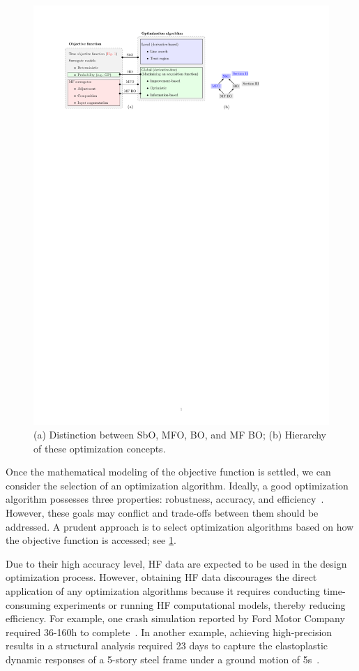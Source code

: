 \documentclass[iicol,sn-basic]{sn-jnl}%
\begin{document}
\begin{figure}
	\centering
	\includegraphics[scale=0.82]{Fig2.pdf}
	\caption{(a) Distinction between SbO, MFO, BO, and MF BO; (b) Hierarchy of these optimization concepts.}
	\label{Fig1}
\end{figure}

Once the mathematical modeling of the objective function is settled, we can consider the selection of an optimization algorithm.
Ideally, a good optimization algorithm possesses three properties: robustness, accuracy, and efficiency~\citep{Nocedal2006}.
However, these goals may conflict and trade-offs between them should be addressed.
A prudent approach is to select optimization algorithms based on how the objective function is accessed; see \cref{Fig1}.

Due to their high accuracy level, HF data are expected to be used in the design optimization process.
However, obtaining HF data discourages the direct application of any optimization algorithms because it requires conducting time-consuming experiments or running HF computational models, thereby reducing efficiency.
For example, one crash simulation reported by Ford Motor Company required 36-160h to complete~\citep{Wang2006}.
In another example, achieving high-precision results in a structural analysis required 23 days to capture the elastoplastic dynamic responses of a 5-story steel frame under a ground motion of 5s~\citep{Ohsaki2009}.  
\end{document}
